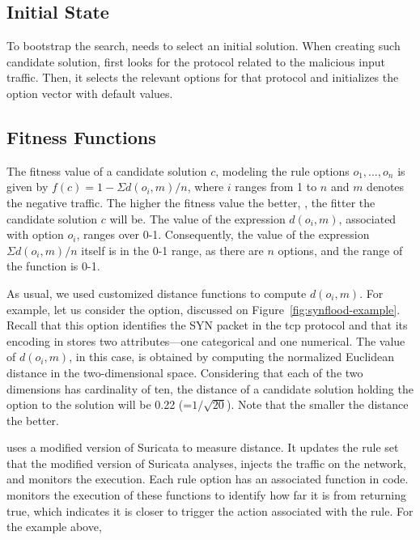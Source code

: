 \documentclass[conference]{IEEEtran}
\begin{document}
\subsection{Initial State}

To bootstrap the search, \tname{} needs to select an initial
solution. When creating such candidate solution, \tname{} first looks
for the protocol related to the malicious input traffic. Then, it
selects the relevant options for that protocol and initializes the
option vector with default values. 


\subsection{Fitness Functions}

The fitness value of a candidate solution $c$, modeling the rule
options $o_1, \dots, o_n$ is given by $f(c)=1-\Sigma{d(o_i,m)}/n$,
where $i$ ranges from 1 to $n$ and $m$ denotes the negative
traffic. The higher the fitness value the better, \ie{}, the fitter
the candidate solution $c$ will be.  The value of the expression
$d(o_i,m)$, associated with option $o_i$, ranges over
0-1. Consequently, the value of the expression $\Sigma{d(o_i,m)}/n$
itself is in the 0-1 range, as there are $n$ options, and the range of
the function is 0-1.

As usual, we used customized distance functions to compute $d(o_i,
m)$. For example, let us consider the  option, discussed
on Figure~\ref{fig:synflood-example}. Recall that this option
identifies the SYN packet in the tcp protocol and that its encoding in
\tname{} stores two attributes---one categorical and one
numerical. The value of $d(o_i, m)$, in this case, is obtained by
computing the normalized Euclidean distance in the two-dimensional
space. Considering that each of the two dimensions has cardinality of
ten, the distance of a candidate solution holding the option
 to the solution will be 0.22
(=$1/\sqrt{20}$). Note that the smaller the distance the better.

\tname{} uses a modified version of Suricata to measure distance. It
updates the rule set that the modified version of Suricata analyses,
injects the traffic on the network, and monitors the execution. Each
rule option has an associated  function in code. \tname{}
monitors the execution of these functions to identify how far it is
from returning true, which indicates it is closer to trigger the
action associated with the rule. For the example above,
\end{document}

